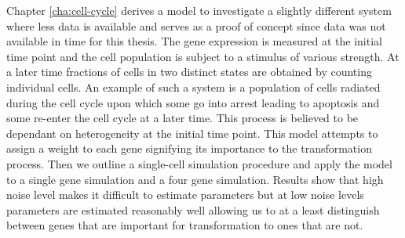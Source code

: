 Chapter \ref{cha:cell-cycle} derives a model to investigate a slightly different system where less data is available and serves as a proof of concept since data was not available in time for this thesis. The gene expression is measured at the initial time point and the cell population is subject to a stimulus of various strength. At a later time fractions of cells in two distinct states are obtained by counting individual cells. An example of such a system is a population of cells radiated during the cell cycle upon which some go into arrest leading to apoptosis and some re-enter the cell cycle at a later time. This process is believed to be dependant on heterogeneity at the initial time point. This model attempts to assign a weight to each gene signifying its importance to the transformation process. Then we outline a single-cell simulation procedure and apply the model to a single gene simulation and a four gene simulation. Results show that high noise level makes it difficult to estimate parameters but at low noise levels parameters are estimated reasonably well allowing us to at a least distinguish between genes that are important for transformation to ones that are not.

